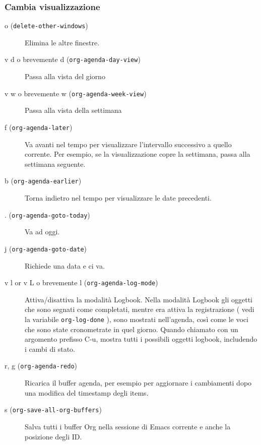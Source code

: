 \documentclass[11pt]{article}
\begin{document}
\subsubsection*{Cambia visualizzazione}
\label{sec:org1ca9781}
\begin{description}
\item[{o (\texttt{delete-other-windows})}] Elimina le altre finestre.

\item[{v d o brevemente d (\texttt{org-agenda-day-view})}] Passa alla vista del giorno

\item[{v w o brevemente w (\texttt{org-agenda-week-view})}] Passa alla vista della settimana

\item[{f (\texttt{org-agenda-later})}] Va avanti nel tempo per visualizzare l'intervallo successivo a
quello corrente. Per esempio, se la visualizzazione copre la
settimana, passa alla settimana seguente.

\item[{b (\texttt{org-agenda-earlier})}] Torna indietro nel tempo per visualizzare le date precedenti.

\item[{. (\texttt{org-agenda-goto-today})}] Va ad oggi.

\item[{j (\texttt{org-agenda-goto-date})}] Richiede una data e ci va.

\item[{v l or v L o brevemente l (\texttt{org-agenda-log-mode})}] Attiva/disattiva la modalità Logbook. Nella modalità Logbook gli
oggetti che sono segnati come completati, mentre era attiva la
registrazione ( vedi la variabile \texttt{org-log-done} ), sono mostrati
nell'agenda, così come le voci che sono state cronometrate in quel
giorno. Quando chiamato con un argomento prefisso C-u,
mostra tutti i possibili oggetti logbook, includendo i cambi di
stato.

\item[{r, g (\texttt{org-agenda-redo})}] Ricarica il buffer agenda, per esempio per aggiornare i cambiamenti
dopo una modifica del timestamp degli items.

\item[{s (\texttt{org-save-all-org-buffers})}] Salva tutti i buffer Org nella sessione di Emacs corrente e anche la
posizione degli ID.
\end{description}
\end{document}
